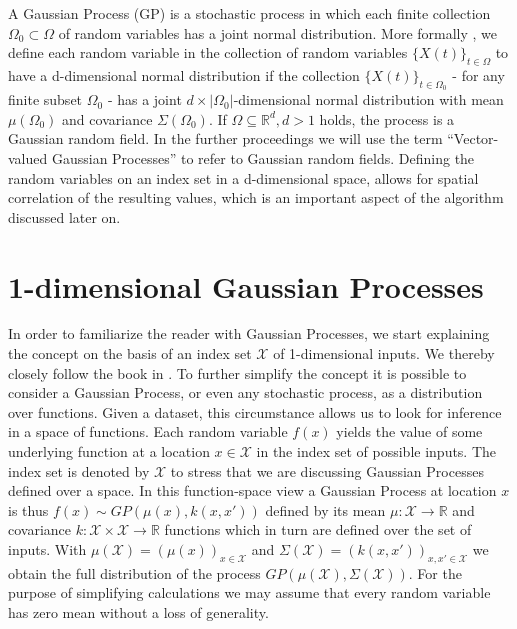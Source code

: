 A Gaussian Process (GP) is a stochastic process in which each finite collection $\Omega_{0} \subset \Omega$ of random variables has a joint normal distribution. More formally \cite[p.306]{formalGP}, we define each random variable in the collection of random variables $\{X(t)\}_{t \in \Omega}$ to have a d-dimensional normal distribution if the collection $\{X(t)\}_{t \in \Omega_{0}}$ - for any finite subset $\Omega_{0}$ - has a joint $d\times \left| \Omega_{0} \right|$-dimensional normal distribution with mean
$\mu (\Omega_{0})$ and covariance $\Sigma (\Omega_{0})$.  
If $\Omega \subseteq \mathbb{R}^{d}, d>1$ holds, the process is a Gaussian random field. In the further proceedings we will use the term ``Vector-valued Gaussian Processes'' to refer to Gaussian random fields. Defining the random variables on an index set in a d-dimensional space, allows for spatial correlation of the resulting values, which is an important aspect of the algorithm discussed later on.

\section{1-dimensional Gaussian Processes}
In order to familiarize the reader with Gaussian Processes, we start explaining the concept on the basis of an index set $\mathcal{X}$ of 1-dimensional inputs. We thereby closely follow the book in \cite{GP}. To further simplify the concept it is possible to consider a Gaussian Process, or even any stochastic process, as a distribution over functions. Given a dataset, this circumstance allows us to look for inference in a space of functions. Each random variable $f(x)$ yields the value of some underlying function at a location $x \in
\mathcal{X}$ in the index set of possible inputs. The index set is denoted by $\mathcal{X}$ to stress that we are discussing Gaussian Processes defined over a space. In this function-space view a Gaussian Process at location $x$ is thus $f(x) \sim GP(\mu(x), k(x,x'))$ defined by its mean $\mu:\mathcal{X} \rightarrow \mathbb{R}$ and covariance $k:\mathcal{X} \times \mathcal{X} \rightarrow \mathbb{R}$ functions which in turn are defined over the set of inputs. With $\mu(\mathcal{X})=(\mu(x))_{x \in \mathcal{X}}$ and $\Sigma(\mathcal{X})=(k(x,x'))_{x,x' \in \mathcal{X}}$ we obtain the full distribution of the process $GP(\mu(\mathcal{X}),
\Sigma(\mathcal{X}))$. For the purpose of simplifying calculations we may assume that every random variable has zero mean without a loss of generality.

